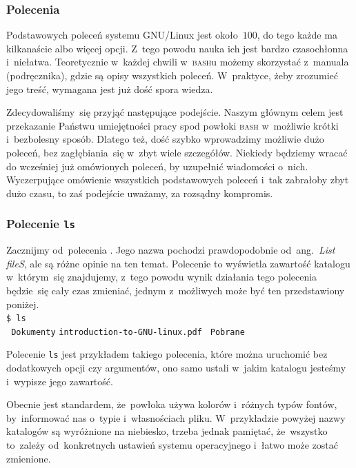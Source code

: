 \documentclass[10pt,t]{beamer}
\begin{document}
\begin{frame}
  \frametitle{Polecenia}


  Podstawowych poleceń systemu GNU/Linux jest około~$100$, do tego każde ma
  kilkanaście albo więcej opcji. Z~tego powodu nauka ich jest bardzo
  czasochłonna i~niełatwa. Teoretycznie w~każdej chwili w~\textsc{bash}u
  możemy skorzystać z~manuala (podręcznika), gdzie są opisy wszystkich
  poleceń. W~praktyce, żeby zrozumieć jego treść, wymagana jest już dość
  spora wiedza.

  Zdecydowaliśmy~się przyjąć następujące podejście. Naszym głównym celem
  jest przekazanie Państwu umiejętności pracy spod powłoki \textsc{bash}
  w~możliwie krótki i~bezbolesny sposób. Dlatego też, dość szybko
  wprowadzimy możliwie dużo poleceń, bez zagłębiania~się w~zbyt wiele
  szczegółów. Niekiedy będziemy wracać do wcześniej już omówionych poleceń,
  by uzupełnić wiadomości o~nich. Wyczerpujące omówienie wszystkich
  podstawowych poleceń i~tak zabrałoby zbyt dużo czasu, to zaś podejście
  uważamy, za rozsądny kompromis.

\end{frame}





\begin{frame}
  \frametitle{Polecenie \texttt{ls}}


  Zacznijmy od~polecenia
  . Jego nazwa
  pochodzi prawdopodobnie od~ang.~\textit{List fileS}, ale są różne opinie
  na ten temat. Polecenie to wyświetla zawartość katalogu w~którym~się
  znajdujemy, z~tego powodu wynik działania tego polecenia będzie~się cały
  czas zmieniać, jednym z~możliwych może być ten przedstawiony poniżej. \\
  \texttt{\$ ls} \\
  \texttt{{\color{jAxisBlue} Dokumenty}} \quad
  \texttt{introduction-to-GNU-linux.pdf} \quad
  \texttt{{\color{jAxisBlue} Pobrane}}

  Polecenie \texttt{ls} jest przykładem takiego polecenia, które można
  uruchomić bez dodatkowych opcji czy argumentów, ono samo ustali w~jakim
  katalogu jesteśmy i~wypisze jego zawartość.

  Obecnie jest standardem, że~powłoka używa kolorów i~różnych typów fontów,
  by~informować nas o~typie i~własnościach pliku. W~przykładzie powyżej
  nazwy katalogów są wyróżnione na niebiesko, trzeba jednak pamiętać,
  że~wszystko to~zależy od~konkretnych ustawień systemu operacyjnego
  i~łatwo może zostać zmienione.

\end{frame}
\end{document}
